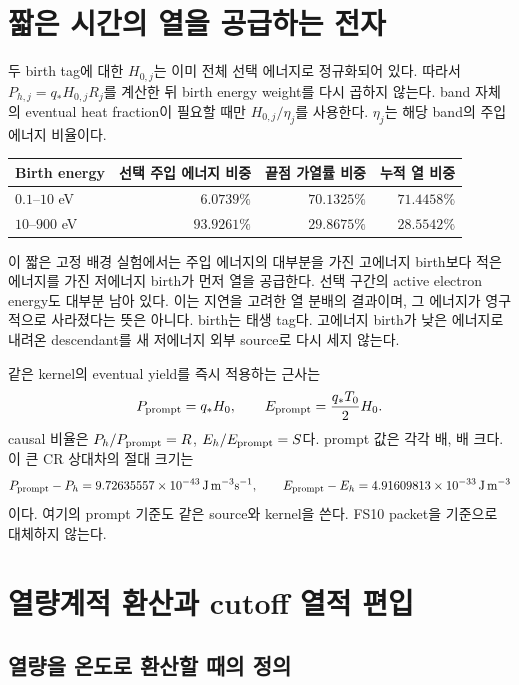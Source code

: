\documentclass[11pt,a4paper]{article}
\newcommand{\units}[1]{\,\mathrm{#1}}
\begin{document}
\section{짧은 시간의 열을 공급하는 전자}

두 birth tag에 대한 \(H_{0,j}\)는 이미 전체 선택 에너지로 정규화되어 있다.
따라서 \(P_{h,j}=q_*H_{0,j}R_j\)를 계산한 뒤 birth energy weight를 다시 곱하지 않는다.
band 자체의 eventual heat fraction이 필요할 때만 \(H_{0,j}/\eta_j\)를 사용한다.
\(\eta_j\)는 해당 band의 주입 에너지 비율이다.\cite{paired,pulse,calc}

\begin{center}
\small
\begin{tabular}{lrrr}
\toprule
Birth energy & 선택 주입 에너지 비중 & 끝점 가열률 비중 & 누적 열 비중\\
\midrule
\(0.1\)--\(10\) eV & \(6.0739\%\) & \(70.1325\%\) & \(71.4458\%\)\\
\(10\)--\(900\) eV & \(93.9261\%\) & \(29.8675\%\) & \(28.5542\%\)\\
\bottomrule
\end{tabular}
\end{center}

이 짧은 고정 배경 실험에서는 주입 에너지의 대부분을 가진 고에너지 birth보다 적은 에너지를
가진 저에너지 birth가 먼저 열을 공급한다. 선택 구간의 active electron energy도 대부분 남아 있다.
이는 지연을 고려한 열 분배의 결과이며, 그 에너지가 영구적으로 사라졌다는 뜻은 아니다.
birth는 태생 tag다. 고에너지 birth가 낮은 에너지로 내려온 descendant를 새 저에너지 외부
source로 다시 세지 않는다.

같은 kernel의 eventual yield를 즉시 적용하는 근사는
\[
P_{\rm prompt}=q_*H_0,\qquad E_{\rm prompt}=\frac{q_*T_0}{2}H_0.
\]
causal 비율은 \(P_h/P_{\rm prompt}=R\), \(E_h/E_{\rm prompt}=S\)다.
prompt 값은 각각 \PromptPowerRatio{}배, \PromptCumuRatio{}배 크다.
이 큰 CR 상대차의 절대 크기는
\[
P_{\rm prompt}-P_h=\PromptPowerError\units{J\,m^{-3}s^{-1}},\qquad
E_{\rm prompt}-E_h=\PromptCumuError\units{J\,m^{-3}}
\]
이다. 여기의 prompt 기준도 같은 source와 kernel을 쓴다. FS10 packet을 기준으로 대체하지 않는다.

\section{열량계적 환산과 cutoff 열적 편입}

\subsection{열량을 온도로 환산할 때의 정의}
\end{document}
